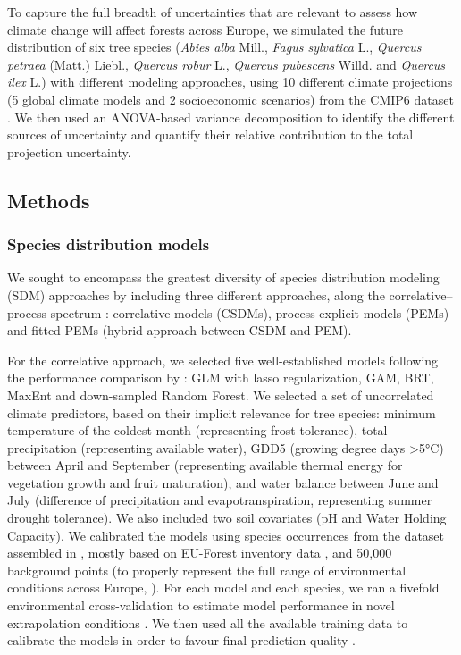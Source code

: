 To capture the full breadth of uncertainties that are relevant to assess how climate change will affect forests across Europe,
we simulated the future distribution of six tree species (\emph{Abies alba} Mill., \emph{Fagus sylvatica} L., \emph{Quercus petraea} (Matt.) Liebl., \emph{Quercus robur} L., \emph{Quercus pubescens} Willd. and \emph{Quercus ilex} L.) with different modeling approaches, using 10 different climate projections (5 global climate models and 2 socioeconomic scenarios) from the CMIP6 dataset \citep{Noel2022}. We then used an ANOVA-based variance decomposition to identify the different sources of uncertainty and quantify their relative contribution to the total projection uncertainty.

\clearpage

\subsection{Methods}

\subsubsection{Species distribution models}

We sought to encompass the greatest diversity of species distribution modeling (SDM) approaches by including three different approaches, along the correlative–process spectrum \citep{Dormann2012}: correlative models (CSDMs), process-explicit models (PEMs) and fitted PEMs (hybrid approach between CSDM and PEM).

For the correlative approach, we selected five well-established models following the performance comparison by \cite{Valavi2022}: GLM with lasso regularization, GAM, BRT, MaxEnt and down-sampled Random Forest. We selected a set of uncorrelated climate predictors, based on their implicit relevance for tree species: minimum temperature of the coldest month (representing frost tolerance), total precipitation (representing available water), GDD5 (growing degree days \textgreater5°C) between April and September (representing available thermal energy for vegetation growth and fruit maturation), and water balance between June and July (difference of precipitation and evapotranspiration, representing summer drought tolerance). We also included two soil covariates (pH and Water Holding Capacity). We calibrated the models using species occurrences from the dataset assembled in \cite{VanderMeersch2023}, mostly based on EU-Forest inventory data \citep{Mauri2017}, and 50,000 background points (to properly represent the full range of environmental conditions across Europe, \citealp{Valavi2022}). For each model and each species, we ran a fivefold environmental cross-validation to estimate model performance in novel extrapolation conditions \citep{Roberts2017}. We then used all the available training data to calibrate the models in order to favour final prediction quality \citep{Roberts2017}.

